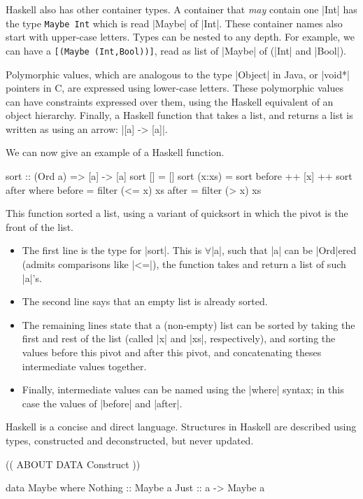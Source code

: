 \documentclass[11pt]{article}
\begin{document}
Haskell also has other container types. A container
that {\em may\/} contain one |Int| has the type
\verb|Maybe Int|
which is read |Maybe| of |Int|.
These container names also start with upper-case letters.
Types can be nested to any depth. For example, we can have a \verb|[(Maybe (Int,Bool))]|,
read as list of |Maybe| of (|Int| and |Bool|).

Polymorphic values, which are analogous to the type |Object| in Java,
or |void*| pointers in C, are expressed using lower-case letters.
These polymorphic values can have constraints expressed over them,
using the Haskell equivalent of an object hierarchy.
Finally, a Haskell function that takes a list, and returns a list
is written as using an arrow: |[a] -> [a]|.

We can now give an example of a Haskell function.%
\begin{Code}

sort :: (Ord a) => [a] -> [a]
sort []     = []
sort (x:xs) = sort before ++ [x] ++ sort after
  where
        before = filter (<= x) xs
        after  = filter (> x) xs

\end{Code}
This function sorted a list, using a variant of quicksort in which the pivot is
the front of the list.
\begin{itemize}
\item The first line is the type for |sort|. This is $\forall$|a|, such that
|a| can be |Ord|ered (admits comparisons like |<=|), the function
takes and return a list of such |a|'s.
\item The second line says that an empty list is already sorted.
\item The remaining lines state that a (non-empty) list can be
sorted by taking the first and rest of the list (called |x| and |xs|, respectively),
and sorting the values before this pivot and after this pivot,
and concatenating theses intermediate values together.
\item Finally, intermediate values can be named using the |where| syntax;
in this case the values of |before| and |after|.
\end{itemize}

Haskell is a concise and direct language.
Structures in Haskell are described using types, constructed
and deconstructed, but never updated. 

(( ABOUT DATA Construct ))

\begin{Code}
        
data Maybe where
  Nothing ::      Maybe a
  Just    :: a -> Maybe a

\end{Code}
\end{document}

